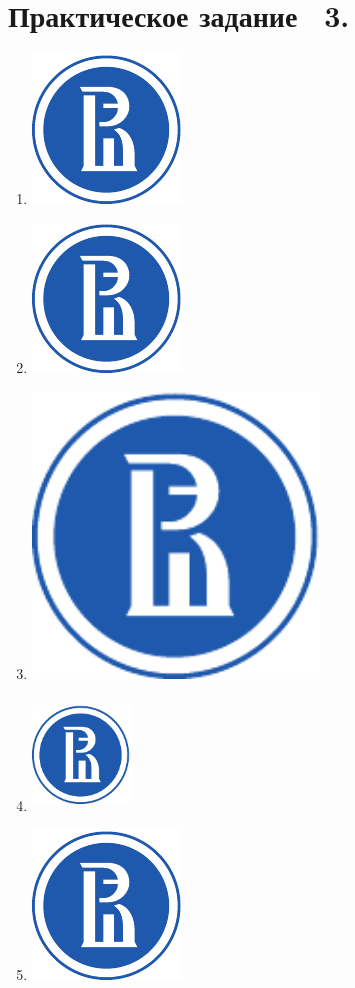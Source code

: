 \documentclass[a4paper,12pt]{article}
\begin{document}
 

\section*{Практическое задание \textnumero~3.}

\begin{multicols}{2}
	\begin{enumerate}	
		\item \includegraphics{logo}
		\item \includegraphics[scale=2.5]{logo}
		\item \includegraphics[height=3in, keepaspectratio]{logo}
		\item \includegraphics[height=30mm, width=26mm]{logo}
		\item \includegraphics[height=0.2\textheight]{logo}
	\end{enumerate}
\end{multicols}
\end{document}
